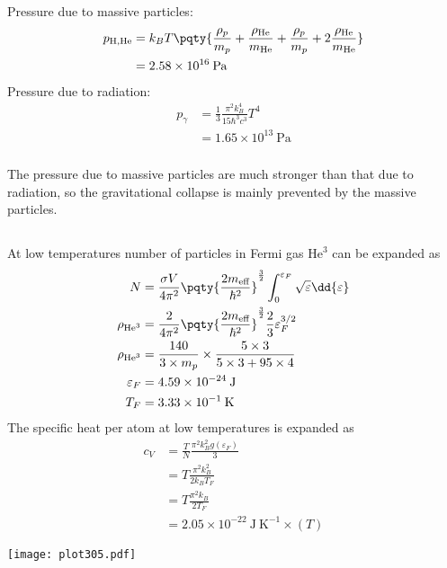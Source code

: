 \documentclass[12pt]{article}
\begin{document}
     \subsubsection{} Pressure due to massive particles: \begin{align*}
        p_{\mathrm{H},\mathrm{He}} &= k_BT \pqty{\frac{\rho_p}{m_p} + \frac{\rho_\mathrm{He}}{m_\mathrm{He}} + \frac{\rho_p}{m_p} + 2\frac{\rho_\mathrm{He}}{m_\mathrm{He}} }\\
        &= 2.58 \times 10^{ 16}\: \mathrm{Pa}
    \end{align*}
    Pressure due to radiation: \begin{align*}
        p_{\gamma} &= \frac{1}{3} \frac{\pi^2k_B^4}{15\hbar^3c^3}T^4\\
        &= 1.65 \times 10^{13}\: \mathrm{Pa}
    \end{align*}
     \subsubsection{} The pressure due to massive particles are much stronger than that due to radiation, so the gravitational collapse is mainly prevented by the massive particles.
     \subsection{}
    At low temperatures number of particles in Fermi gas \(\mathrm{He}^3\) can be expanded as \begin{align*}
        N &= \frac{\sigma V}{4\pi^2}\pqty{\frac{2m_{\text{eff}}}{\hbar^2}}^\frac{3}{2} \int_0^{\varepsilon_F} \sqrt{\varepsilon}\dd{\varepsilon}\\
        \rho_{\mathrm{He}^3} &= \frac{2}{4\pi^2}\pqty{\frac{2m_{\text{eff}}}{\hbar^2}}^\frac{3}{2} \frac{2}{3}\varepsilon_F^{3 /2}\\
        \rho_{\mathrm{He}^3} &= \frac{140}{3 \times m_{p}} \times \frac{5 \times 3}{5 \times 3 + 95 \times 4}\\
        \varepsilon_F &= 4.59 \times 10^{ - 24}\: \mathrm{J}\\
        T_F &= 3.33 \times 10^{ - 1}\: \mathrm{K}
    \end{align*}
    The specific heat per atom at low temperatures is expanded as \begin{align*}
        c_V&= \frac{T}{N} \frac{\pi^2k_B^2g(\varepsilon_F)}{3}\\
        &= T \frac{\pi^2k_B^{2} }{2k_B T_F}\\
        &= T \frac{\pi^2k_B }{2T_F}\\
        &= 2.05 \times 10^{ - 22} \: \mathrm{J\: K^{ - 1}} \times (T)
    \end{align*}
    \begin{center}
        \texttt{[image: plot305.pdf]}
    \end{center}
\end{document}
